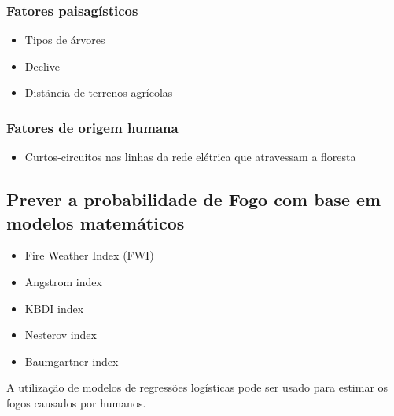 \documentclass{article}
\begin{document}
\subsubsection{Fatores paisagísticos}
\begin{itemize}
    \item Tipos de árvores
    \item Declive
    \item Distãncia de terrenos agrícolas
\end{itemize}

\subsubsection{Fatores de origem humana}
\begin{itemize}
    \item Curtos-circuitos nas linhas da rede elétrica que atravessam a floresta
\end{itemize}

\subsection{Prever a probabilidade de Fogo com base em modelos matemáticos}
\begin{itemize}
    \item Fire Weather Index (FWI)
    \item Angstrom index
    \item KBDI index
    \item Nesterov index
    \item Baumgartner index
\end{itemize}
A utilização de modelos de regressões logísticas pode ser usado para estimar os fogos causados por humanos.




\end{document}
